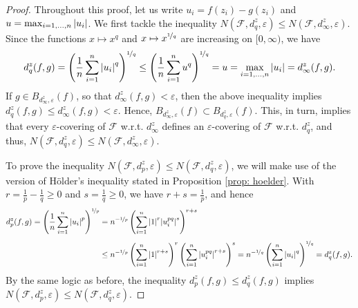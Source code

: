 \begin{proof}
Throughout this proof, let us write $u_i = f(z_i) - g(z_i)$ and $u = \max_{i=1, \dots, n} \abs{u_i}$. We first tackle the inequality $N(\mathcal{F}, d_q^z, \varepsilon) \leq N(\mathcal{F}, d_{\infty}^z, \varepsilon)$. Since the functions $x \mapsto x^q$ and $x \mapsto x^{\nicefrac{1}{q}}$ are increasing on $[0, \infty)$, we have
\[
    d_q^z(f, g) = \left( \frac{1}{n} \sum_{i=1}^n \abs{u_i}^q \right)^{\nicefrac{1}{q}} \leq \left( \frac{1}{n} \sum_{i=1}^n u^q \right)^{\nicefrac{1}{q}} = u = \max_{i=1, \dots, n} \abs{u_i} = d_{\infty}^z(f, g).
\]
If $g \in B_{d_{\infty}^z, \varepsilon}(f)$, so that $d_{\infty}^z(f, g) < \varepsilon$, then the above inequality implies $d_q^z(f, g) \leq d_{\infty}^z(f, g) < \varepsilon$. Hence, $B_{d_{\infty}^z, \varepsilon}(f) \subset B_{d_q^z, \varepsilon}(f)$. This, in turn, implies that every $\varepsilon$-covering of $\mathcal{F}$ w.r.t. $d_{\infty}^z$ defines an $\varepsilon$-covering of $\mathcal{F}$ w.r.t. $d_q^z$, and thus, $N(\mathcal{F}, d_q^z, \varepsilon) \leq N(\mathcal{F}, d_{\infty}^z, \varepsilon)$.

To prove the inequality $N(\mathcal{F}, d_p^z, \varepsilon) \leq N(\mathcal{F}, d_q^z, \varepsilon)$, we will make use of the version of H{\"o}lder's inequality stated in Proposition \ref{prop: hoelder}. With $r = \frac{1}{p} - \frac{1}{q} \geq 0$ and $s = \frac{1}{q} \geq 0$, we have $r + s = \frac{1}{p}$, and hence
\begin{align*}
    d_p^z(f, g) = \left( \frac{1}{n} \sum_{i=1}^n \abs{u_i}^p \right)^{\nicefrac{1}{p}} &= n^{-\nicefrac{1}{p}} \left( \sum_{i=1}^n \abs{1}^r \abs{u_i^{pq}}^s \right)^{r+s} \\[4pt]
        &\leq n^{-\nicefrac{1}{p}} \left( \sum_{i=1}^n \abs{1}^{r+s} \right)^r \left( \sum_{i=1}^n \abs{u_i^{pq}}^{r+s} \right)^s = n^{-\nicefrac{1}{q}} \left( \sum_{i=1}^n \abs{u_i}^{q} \right)^{\nicefrac{1}{q}} = d_q^z(f, g).
\end{align*}
By the same logic as before, the inequality $d_p^z(f, g) \leq d_q^z(f, g)$ implies $N(\mathcal{F}, d_p^z, \varepsilon) \leq N(\mathcal{F}, d_q^z, \varepsilon)$.
\end{proof}
